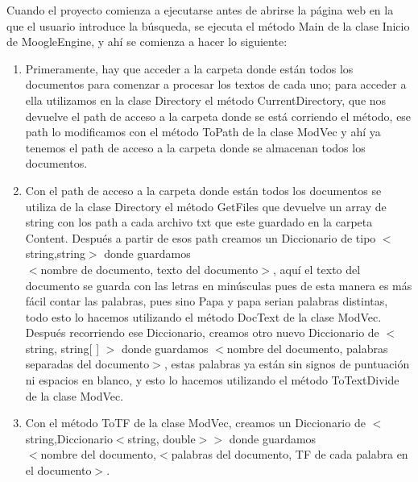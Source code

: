 \documentclass[12pt, a4paper]{article}
\begin{document}
Cuando el proyecto comienza a ejecutarse antes de abrirse la página web
en la que el usuario introduce la búsqueda, se ejecuta el método Main
de la clase Inicio de MoogleEngine, y ahí se comienza a hacer lo siguiente:

\begin{enumerate}
      \item Primeramente, hay que acceder a la carpeta donde están todos los documentos
            para comenzar a procesar los textos de cada uno; para acceder a ella
            utilizamos en la clase Directory el método CurrentDirectory, que nos
            devuelve el path de acceso a la carpeta donde se está corriendo el método,
            ese path lo modificamos con el método ToPath de la clase ModVec y ahí ya
            tenemos el path de acceso a la carpeta donde se almacenan todos
            los documentos.
      \item Con el path de acceso a la carpeta donde están todos los documentos
            se utiliza de la clase Directory el método GetFiles que devuelve
            un array de string con los path a cada archivo txt que este guardado
            en la carpeta Content. Después a partir de esos path creamos un
            Diccionario de tipo $<$string,string$>$ donde guardamos\\
            $<$nombre de documento, texto del documento$>$, aquí el texto del documento
            se guarda con las letras en minúsculas pues de esta manera es más fácil
            contar las palabras, pues sino Papa y papa serian palabras distintas,
            todo esto lo hacemos utilizando el método DocText de la clase ModVec.
            Después recorriendo ese Diccionario, creamos otro nuevo Diccionario de
            $<$string, string[ ] $>$ donde guardamos
            $<$nombre del documento, palabras separadas del documento$>$,
            estas palabras ya están sin signos de puntuación ni espacios en blanco,
            y esto lo hacemos utilizando el método ToTextDivide de la clase ModVec.
      \item Con el método ToTF de la clase ModVec, creamos un Diccionario de
            $<$string,Diccionario$<$string, double$>$$>$ donde guardamos\\
            $<$nombre del documento,$<$palabras del documento, TF de cada palabra en el documento$>$.\\


\end{enumerate}
\end{document}
